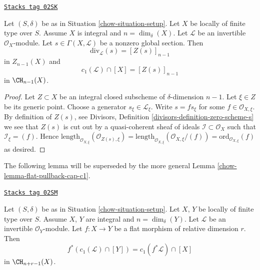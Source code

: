 \begin{lemma}[Compute c1]
\label{chow-lemma-compute-c1}
\href{https://stacks.math.columbia.edu/tag/02SK}{\texttt{Stacks tag 02SK}}

Let $(S, \delta)$ be as in Situation \ref{chow-situation-setup}.
Let $X$ be locally of finite type over $S$. Assume $X$ is
integral and $n = \dim_\delta(X)$.
Let $\mathcal{L}$ be an invertible $\mathcal{O}_X$-module.
Let $s \in \Gamma(X, \mathcal{L})$ be a nonzero global section.
Then
$$
\text{div}_\mathcal{L}(s) = [Z(s)]_{n - 1}
$$
in $Z_{n - 1}(X)$ and
$$
c_1(\mathcal{L}) \cap [X] = [Z(s)]_{n - 1}
$$
in $\CH_{n - 1}(X)$.
\end{lemma}

\begin{proof}
Let $Z \subset X$ be an integral closed subscheme of
$\delta$-dimension $n - 1$. Let $\xi \in Z$ be its generic
point. Choose a generator $s_\xi \in \mathcal{L}_\xi$.
Write $s = fs_\xi$ for some $f \in \mathcal{O}_{X, \xi}$.
By definition of $Z(s)$, see
Divisors, Definition \ref{divisors-definition-zero-scheme-s}
we see that $Z(s)$ is cut out by a quasi-coherent
sheaf of ideals $\mathcal{I} \subset \mathcal{O}_X$ such
that $\mathcal{I}_\xi = (f)$. Hence
$\text{length}_{\mathcal{O}_{X, \xi}}(\mathcal{O}_{Z(s), \xi})
=
\text{length}_{\mathcal{O}_{X, \xi}}(\mathcal{O}_{X, \xi}/(f))
=
\text{ord}_{\mathcal{O}_{X, \xi}}(f)$ as desired.
\end{proof}

The following lemma will be superseded by the more general
Lemma \ref{chow-lemma-flat-pullback-cap-c1}.

\begin{lemma}
\label{chow-lemma-flat-pullback-divisor-invertible-sheaf}
\href{https://stacks.math.columbia.edu/tag/02SM}{\texttt{Stacks tag 02SM}}

Let $(S, \delta)$ be as in Situation \ref{chow-situation-setup}.
Let $X$, $Y$ be locally of finite type over $S$. Assume $X$, $Y$
are integral and $n = \dim_\delta(Y)$.
Let $\mathcal{L}$ be an invertible $\mathcal{O}_Y$-module.
Let $f : X \to Y$ be a flat morphism of relative dimension $r$. Then
$$
f^*(c_1(\mathcal{L}) \cap [Y]) = c_1(f^*\mathcal{L}) \cap [X]
$$
in $\CH_{n + r - 1}(X)$.
\end{lemma}

